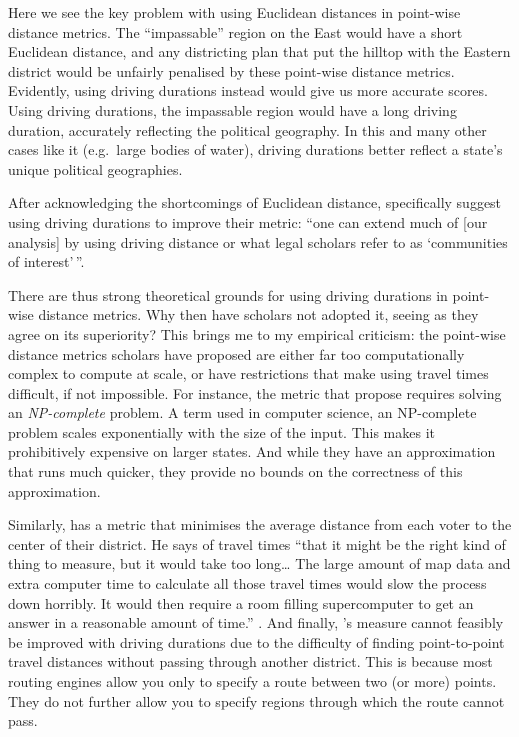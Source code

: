 \documentclass[]{article}
\begin{document}
Here we see the key problem with using Euclidean distances in point-wise
distance metrics. The ``impassable'' region on the East would have a
short Euclidean distance, and any districting plan that put the hilltop
with the Eastern district would be unfairly penalised by these
point-wise distance metrics. Evidently, using driving durations instead
would give us more accurate scores. Using driving durations, the
impassable region would have a long driving duration, accurately
reflecting the political geography. In this and many other cases like it
(e.g.~large bodies of water), driving durations better reflect a state's
unique political geographies.

After acknowledging the shortcomings of Euclidean distance,
\citeauthor{fh2011} specifically suggest using driving durations to
improve their metric: ``one can extend much of {[}our analysis{]} by
using driving distance or what legal scholars refer to as `communities
of interest'\,''.

There are thus strong theoretical grounds for using driving durations in
point-wise distance metrics. Why then have scholars not adopted it,
seeing as they agree on its superiority? This brings me to my empirical
criticism: the point-wise distance metrics scholars have proposed are
either far too computationally complex to compute at scale, or have
restrictions that make using travel times difficult, if not impossible.
For instance, the metric that \citet{fh2011} propose requires solving an
\emph{NP-complete} problem. A term used in computer science, an
NP-complete problem scales exponentially with the size of the input.
This makes it prohibitively expensive on larger states. And while they
have an approximation that runs much quicker, they provide no bounds on
the correctness of this approximation.

Similarly, \citeauthor{olson2010} has a metric that minimises the
average distance from each voter to the center of their district. He
says of travel times ``that it might be the right kind of thing to
measure, but it would take too long\ldots{} The large amount of map data
and extra computer time to calculate all those travel times would slow
the process down horribly. It would then require a room filling
supercomputer to get an answer in a reasonable amount of time.''
\citep{olson2010}. And finally, \citeauthor{cm2010}'s measure cannot
feasibly be improved with driving durations due to the difficulty of
finding point-to-point travel distances without passing through another
district. This is because most routing engines allow you only to specify
a route between two (or more) points. They do not further allow you to
specify regions through which the route cannot pass.
\end{document}
